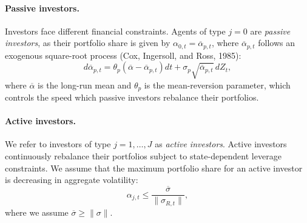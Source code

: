 \paragraph{Passive investors.} Investors face different financial constraints. Agents of type $j = 0 $ are \textit{passive investors}, as their portfolio share is given by $\alpha_{0,t} = \overline{\alpha}_{p,t}$, where $\overline{\alpha}_{p,t}$ follows an exogenous square-root process (Cox, Ingersoll, and Ross, 1985):
\begin{equation}\label{eq:alpha_p_process}
	d \overline{\alpha}_{p,t} = \theta_p (\overline{\alpha} - \overline{\alpha}_{p,t}) dt + \sigma_{p} \sqrt{\overline{\alpha}_{p,t}}\, d Z_t,
\end{equation}
where $\overline{\alpha}$ is the long-run mean and $\theta_p$ is the mean-reversion parameter, which controls the speed which passive investors rebalance their portfolios. 

\paragraph{Active investors.} We refer to investors of type $j = 1,\ldots, J$ as \textit{active investors}. Active investors continuously rebalance their portfolios subject to state-dependent leverage constraints. We assume that the maximum portfolio share for an active investor is decreasing in aggregate volatility:
\begin{equation}\label{eq:leverage_constraint}
	\alpha_{j,t} \leq \frac{\overline{\sigma}}{\|\sigma_{R,t}\|},
\end{equation}
where we assume $\overline{\sigma} \geq \|\sigma\|$.

